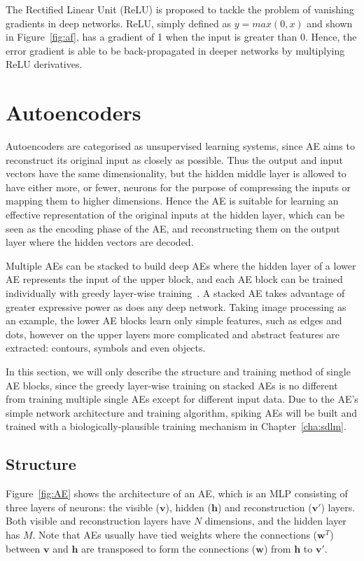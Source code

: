 The Rectified Linear Unit (ReLU) is proposed to tackle the problem of vanishing gradients in deep networks\DIFaddbegin {}\DIFaddend .
ReLU, simply defined as $y = max(0,x)$ and shown in Figure~\ref{fig:af}, has a gradient of 1 when the input is greater than 0.
Hence, the error gradient is able to be back-propagated in deeper networks by multiplying ReLU derivatives.

\section{Autoencoders \DIFaddbegin {}\DIFaddend }
\label{sec:AE}
Autoencoders \DIFdelbegin {}\DIFdelend are categorised as unsupervised learning systems, since AE aims to reconstruct its original input as closely as possible.
Thus the output and input vectors have the same dimensionality, but the hidden middle layer is allowed to have either more, or fewer, neurons for the purpose of compressing the inputs or mapping them to higher dimensions.
Hence the AE is suitable for learning an effective representation of the original inputs at the hidden layer, which can be seen as the encoding phase of the AE, and reconstructing them on the output layer where the hidden vectors are decoded. 

Multiple AEs can be stacked to build deep AEs where the hidden layer of a lower AE represents the input of the upper block, and each AE block can be trained individually with greedy layer-wise training~\citep{hinton2006fast}.
A stacked AE takes advantage of greater expressive power as does any deep network.
Taking image processing as an example, the lower AE blocks learn only simple features, such as edges and dots, however on the upper layers more complicated and abstract features are extracted: contours, symbols and even objects. 

In this section, we will only describe the structure and training method of single AE blocks, since the greedy layer-wise training on stacked AEs is no different from training multiple single AEs except for different input data.
Due to the AE's simple network architecture and training algorithm, spiking AEs will be built and trained with a biologically-plausible training mechanism in Chapter~\ref{cha:sdlm}.

\subsection{Structure}
Figure~\ref{fig:AE} shows the architecture of an AE, which is an MLP consisting of three layers of neurons: the visible ($\mathbf{v}$), hidden ($\mathbf{h}$) and reconstruction ($\mathbf{v'}$) layers.
Both visible and reconstruction layers have $N$ dimensions, and the hidden layer has $M$.
Note that AEs usually have tied weights where the connections ($\mathbf{w}^T$) between $\mathbf{v}$ and $\mathbf{h}$ are transposed to form the connections ($\mathbf{w}$) from $\mathbf{h}$ to $\mathbf{v'}$.


